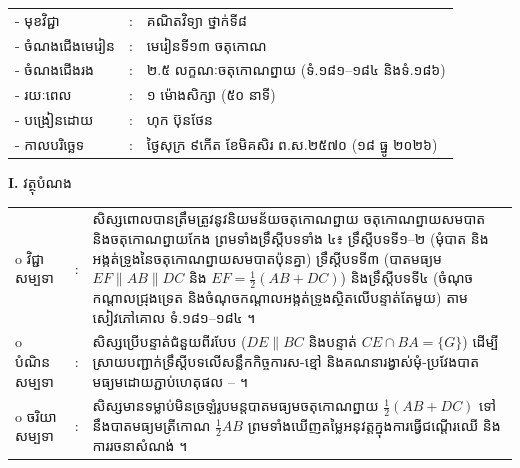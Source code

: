 \documentclass[a4paper,10pt]{article}
\newcommand{\wcirc}{{\CourierBullet\fontsize{9.5pt}{11pt}\selectfont o}}
\newcommand{\cnum}[1]{{\fontsize{10.5pt}{12pt}\selectfont\ding{\numexpr171+#1\relax}}\hspace{0.2em}}
\begin{document}
{\renewcommand{\arraystretch}{0.95}
\hspace*{4.05cm}%
\begin{tabular}{@{}l l l@{}}
  - \hspace{0.35cm} មុខវិជ្ជា & : & គណិតវិទ្យា ថ្នាក់ទី៨ \\
  - \hspace{0.35cm} ចំណងជើងមេរៀន & : & មេរៀនទី១៣ ចតុកោណ \\
  - \hspace{0.35cm} ចំណងជើងរង & : & ២.៥ លក្ខណៈចតុកោណព្នាយ (ទំ.១៨១--១៨៤ និងទំ.១៨៦) \\
  - \hspace{0.35cm} រយៈពេល & : & ១ ម៉ោងសិក្សា (៥០ នាទី) \\
  - \hspace{0.35cm} បង្រៀនដោយ & : & ហុក ប៊ុនថែន \\
  - \hspace{0.35cm} កាលបរិច្ឆេទ & : & ថ្ងៃសុក្រ ៩កើត ខែមិគសិរ ព.ស.២៥៧០ (១៨ ធ្នូ ២០២៦) \\
\end{tabular}

\vspace{1pt}

\textbf{I.} {\muol វត្ថុបំណង}\\[1pt]
\hspace*{0.55cm}%
\begin{tabular}{@{}l l L{14.2cm}@{}}
  \wcirc \hspace{0.25cm} វិជ្ជាសម្បទា & : & សិស្សពោលបានត្រឹមត្រូវនូវនិយមន័យចតុកោណព្នាយ ចតុកោណព្នាយសមបាត និងចតុកោណព្នាយកែង ព្រមទាំងទ្រឹស្ដីបទទាំង ៤៖ ទ្រឹស្ដីបទទី១--២ (មុំបាត និងអង្កត់ទ្រូងនៃចតុកោណព្នាយសមបាតប៉ុនគ្នា) ទ្រឹស្ដីបទទី៣ (បាតមធ្យម $EF\parallel AB\parallel DC$ និង $EF=\frac{1}{2}(AB+DC)$) និងទ្រឹស្ដីបទទី៤ (ចំណុចកណ្ដាលជ្រុងទ្រេត និងចំណុចកណ្ដាលអង្កត់ទ្រូងស្ថិតលើបន្ទាត់តែមួយ) តាមសៀវភៅគោល ទំ.១៨១--១៨៤ ។ \\
  \wcirc \hspace{0.25cm} បំណិនសម្បទា & : & សិស្សប្រើបន្ទាត់ជំនួយពីរបែប ($DE\parallel BC$ និងបន្ទាត់ $CE\cap BA=\{G\}$) ដើម្បីស្រាយបញ្ជាក់ទ្រឹស្ដីបទលើសន្លឹកកិច្ចការស-ខ្មៅ និងគណនារង្វាស់មុំ-ប្រវែងបាតមធ្យមដោយភ្ជាប់ហេតុផល \cnum{1}--\cnum{5} ។ \\
  \wcirc \hspace{0.25cm} ចរិយាសម្បទា & : & សិស្សមានទម្លាប់មិនច្រឡំរូបមន្តបាតមធ្យមចតុកោណព្នាយ $\frac{1}{2}(AB+DC)$ ទៅនឹងបាតមធ្យមត្រីកោណ $\frac{1}{2}AB$ ព្រមទាំងឃើញតម្លៃអនុវត្តក្នុងការធ្វើជណ្ដើរឈើ និងការរចនាសំណង់ ។ \\
\end{tabular}

}
\end{document}
